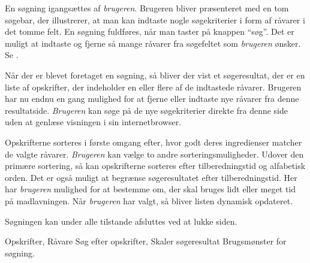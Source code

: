 {En søgning igangsættes af \textit{brugeren}. Brugeren bliver præsenteret med en tom søgebar, der illustrerer, at man kan indtaste nogle søgekriterier i form af råvarer i det tomme felt. En søgning fuldføres, når man taster på knappen ``søg''. Det er muligt at indtaste og fjerne så mange råvarer fra søgefeltet som \textit{brugeren} ønsker. Se .

Når der er blevet foretaget en søgning, så bliver der vist et søgeresultat, der er en liste af opskrifter, der indeholder en eller flere af de indtastede råvarer. Brugeren har nu endnu en gang mulighed for at fjerne eller indtaste nye råvarer fra denne resultatside. \textit{Brugeren} kan søge på de nye søgekriterier direkte fra denne side uden at genlæse visningen i sin internetbrowser.

Opskrifterne sorteres i første omgang efter, hvor godt deres ingredienser matcher de valgte råvarer. \textit{Brugeren} kan vælge to andre sorteringsmuligheder. Udover den primære sortering, så kan opskrifterne sorteres efter tilberedningstid og alfabetisk orden. Det er også muligt at begrænse søgeresultatet efter tilberedningstid. Her har \textit{brugeren} mulighed for at bestemme om, der skal bruges lidt eller meget tid på madlavningen. Når \textit{brugeren} har valgt, så bliver listen dynamisk opdateret.

Søgningen kan under alle tilstande afsluttes ved at lukke siden.}
{Opskrifter, Råvare}
{Søg efter opskrifter, Skaler søgeresultat}
{Brugsmønster for søgning.}
